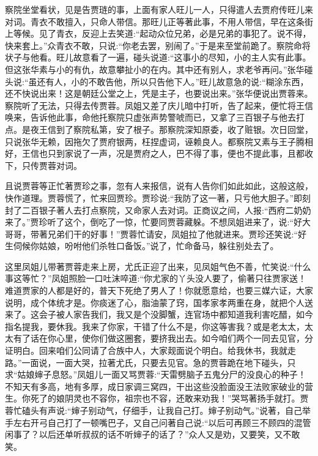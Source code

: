 \begin{parag}
    察院坐堂看状，见是告贾琏的事，上面有家人旺儿一人，只得遣人去贾府传旺儿来对词。青衣不敢擅入，只命人带信。那旺儿正等著此事，不用人带信，早在这条街上等候。见了青衣，反迎上去笑道:“起动众位兄弟，必是兄弟的事犯了。说不得，快来套上。”众青衣不敢，只说:“你老去罢，别闹了。”于是来至堂前跪了。察院命将状子与他看。旺儿故意看了一遍，碰头说道:“这事小的尽知，小的主人实有此事。但这张华素与小的有仇，故意攀扯小的在内。其中还有别人，求老爷再问。”张华碰头说:“虽还有人，小的不敢告他，所以只告他下人。”旺儿故意急的说:“糊涂东西，还不快说出来！这是朝廷公堂之上，凭是主子，也要说出来。”张华便说出贾蓉来。察院听了无法，只得去传贾蓉。凤姐又差了庆儿暗中打听，告了起来，便忙将王信唤来，告诉他此事，命他托察院只虚张声势警唬而已，又拿了三百银子与他去打点。是夜王信到了察院私第，安了根子。那察院深知原委，收了赃银。次日回堂，只说张华无赖，因拖欠了贾府银两，枉捏虚词，诬赖良人。都察院又素与王子腾相好，王信也只到家说了一声，况是贾府之人，巴不得了事，便也不提此事，且都收下，只传贾蓉对词。
\end{parag}


\begin{parag}
    且说贾蓉等正忙著贾珍之事，忽有人来报信，说有人告你们如此如此，这般这般，快作道理。贾蓉慌了，忙来回贾珍。贾珍说:“我防了这一著，只亏他大胆子。”即刻封了二百银子著人去打点察院，又命家人去对词。正商议之间，人报:“西府二奶奶来了。”贾珍听了这个，倒吃了一惊，忙要同贾蓉藏躲。不想凤姐进来了，说:“好大哥哥，带著兄弟们干的好事！”贾蓉忙请安，凤姐拉了他就进来。贾珍还笑说:“好生伺候你姑娘，吩咐他们杀牲口备饭。”说了，忙命备马，躲往别处去了。
\end{parag}


\begin{parag}
    这里凤姐儿带著贾蓉走来上房，尤氏正迎了出来，见凤姐气色不善，忙笑说:“什么事这等忙？”凤姐照脸一口吐沫啐道:“你尤家的丫头没人要了，偷著只往贾家送！难道贾家的人都是好的，普天下死绝了男人了！你就愿意给，也要三媒六证，大家说明，成个体统才是。你痰迷了心，脂油蒙了窍，国孝家孝两重在身，就把个人送来了。这会子被人家告我们，我又是个没脚蟹，连官场中都知道我利害吃醋，如今指名提我，要休我。我来了你家，干错了什么不是，你这等害我？或是老太太，太太有了话在你心里，使你们做这圈套，要挤我出去。如今咱们两个一同去见官，分证明白。回来咱们公同请了合族中人，大家觌面说个明白。给我休书，我就走路。”一面说，一面大哭，拉著尤氏，只要去见官。急的贾蓉跪在地下碰头，只求“姑娘婶子息怒。”凤姐儿一面又骂贾蓉:“天雷劈脑子五鬼分尸的没良心的种子！不知天有多高，地有多厚，成日家调三窝四，干出这些没脸面没王法败家破业的营生。你死了的娘阴灵也不容你，祖宗也不容，还敢来劝我！”哭骂著扬手就打。贾蓉忙磕头有声说:“婶子别动气，仔细手，让我自己打。婶子别动气。”说著，自己举手左右开弓自己打了一顿嘴巴子，又自己问著自己说:“以后可再顾三不顾四的混管闲事了？以后还单听叔叔的话不听婶子的话了？”众人又是劝，又要笑，又不敢笑。
\end{parag}


